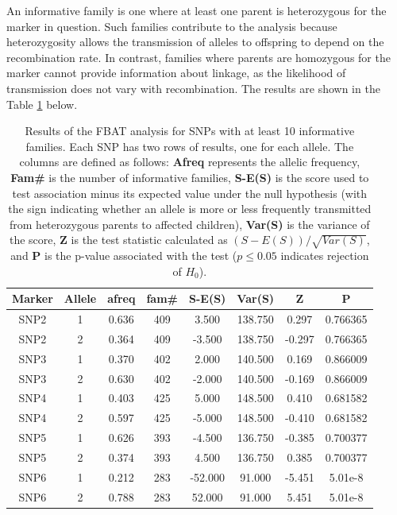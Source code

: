 \documentclass[a4paper,12pt]{article}
\begin{document}
An informative family is one where at least one parent is heterozygous for the marker in question. Such families contribute 
to the analysis because heterozygosity allows the transmission of alleles to offspring to depend on the recombination rate. 
In contrast, families where parents are homozygous for the marker cannot provide information about linkage, as the likelihood 
of transmission does not vary with recombination.
The results are shown in the Table \ref{tab:fbat_results} below.

\begin{table}[ht]
    \centering
    \begin{tabular}{cccccccc}
        \toprule
        \textbf{Marker} & \textbf{Allele} & \textbf{afreq} & \textbf{fam\#} & \textbf{S-E(S)} & \textbf{Var(S)} & \textbf{Z} & \textbf{P} \\ 
        \midrule
        SNP2 & 1 & 0.636 & 409 & 3.500  & 138.750 &  0.297 & 0.766365 \\ 
        SNP2 & 2 & 0.364 & 409 & -3.500 & 138.750 & -0.297 & 0.766365 \\ 
        SNP3 & 1 & 0.370 & 402 & 2.000  & 140.500 &  0.169 & 0.866009 \\ 
        SNP3 & 2 & 0.630 & 402 & -2.000 & 140.500 & -0.169 & 0.866009 \\ 
        SNP4 & 1 & 0.403 & 425 & 5.000  & 148.500 &  0.410 & 0.681582 \\ 
        SNP4 & 2 & 0.597 & 425 & -5.000 & 148.500 & -0.410 & 0.681582 \\ 
        SNP5 & 1 & 0.626 & 393 & -4.500 & 136.750 & -0.385 & 0.700377 \\ 
        SNP5 & 2 & 0.374 & 393 & 4.500  & 136.750 &  0.385 & 0.700377 \\ 
        SNP6 & 1 & 0.212 & 283 & -52.000 & 91.000 & -5.451 & 5.01e-8 \\ 
        SNP6 & 2 & 0.788 & 283 & 52.000  & 91.000 &  5.451 & 5.01e-8 \\ 
        \bottomrule
    \end{tabular}
    \caption{Results of the FBAT analysis for SNPs with at least 10 informative families. Each SNP has two rows of results, 
    one for each allele. The columns are defined as follows: \textbf{Afreq} represents the allelic frequency, \textbf{Fam\#} 
    is the number of informative families, \textbf{S-E(S)} is the score used to test association minus its expected value 
    under the null hypothesis (with the sign indicating whether an allele is more or less frequently transmitted from 
    heterozygous parents to affected children), \textbf{Var(S)} is the variance of the score, \textbf{Z} is the test statistic 
    calculated as $(S-E(S))/\sqrt{Var(S)}$, and \textbf{P} is the p-value associated with the test ($p \leq 0.05$ indicates 
    rejection of $\mathit{H_0}$).}
    \label{tab:fbat_results}
\end{table}
\end{document}
